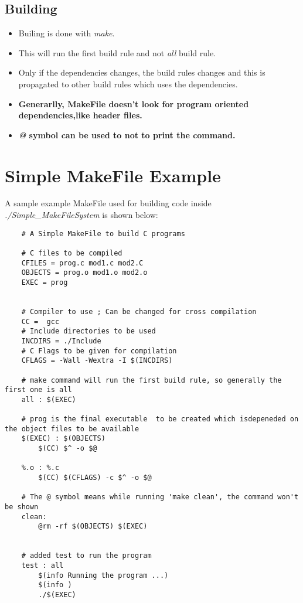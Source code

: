 \documentclass{article}
\begin{document}
\subsection{Building}
\begin{itemize}
    \item Builing is done with \emph{make}.
    \item This will run the first build rule and not \emph{all} build rule.
    \item Only if the dependencies changes, the build rules changes and this is propagated to other build rules which uses the dependencies.
    \item \textbf{Generarlly, MakeFile doesn't look for program oriented dependencies,like header files.}
    \item \textbf{\emph{@} symbol can be used to not to print the command.}
\end{itemize}



\section{Simple MakeFile Example}
\quad A sample example MakeFile used for building code inside \emph{./Simple\_MakeFileSystem} is shown below:


\begin{verbatim}
    # A Simple MakeFile to build C programs

    # C files to be compiled
    CFILES = prog.c mod1.c mod2.C
    OBJECTS = prog.o mod1.o mod2.o
    EXEC = prog


    # Compiler to use ; Can be changed for cross compilation
    CC =  gcc
    # Include directories to be used
    INCDIRS = ./Include
    # C Flags to be given for compilation
    CFLAGS = -Wall -Wextra -I $(INCDIRS)

    # make command will run the first build rule, so generally the first one is all
    all : $(EXEC)

    # prog is the final executable  to be created which isdepeneded on the object files to be available
    $(EXEC) : $(OBJECTS)
        $(CC) $^ -o $@

    %.o : %.c
        $(CC) $(CFLAGS) -c $^ -o $@

    # The @ symbol means while running 'make clean', the command won't be shown 
    clean:
        @rm -rf $(OBJECTS) $(EXEC)


    # added test to run the program
    test : all
        $(info Running the program ...)
        $(info )
        ./$(EXEC)

\end{verbatim}
\end{document}
